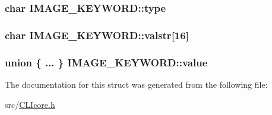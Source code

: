 \hypertarget{structIMAGE__KEYWORD_a93acc5dd5d573d8e91129b27332e4ef4}{
\subsubsection[{type}]{\setlength{\rightskip}{0pt plus 5cm}char I\+M\+A\+G\+E\+\_\+\+K\+E\+Y\+W\+O\+R\+D\+::type}}\label{structIMAGE__KEYWORD_a93acc5dd5d573d8e91129b27332e4ef4}
\hypertarget{structIMAGE__KEYWORD_a148ed6e2cddc70400b2692efbdd23280}{
\subsubsection[{valstr}]{\setlength{\rightskip}{0pt plus 5cm}char I\+M\+A\+G\+E\+\_\+\+K\+E\+Y\+W\+O\+R\+D\+::valstr\mbox{[}16\mbox{]}}}\label{structIMAGE__KEYWORD_a148ed6e2cddc70400b2692efbdd23280}
\hypertarget{structIMAGE__KEYWORD_a93da8b101ca9f8e620803c6e39316b0e}{
\subsubsection[{value}]{\setlength{\rightskip}{0pt plus 5cm}union \{ ... \}   I\+M\+A\+G\+E\+\_\+\+K\+E\+Y\+W\+O\+R\+D\+::value}}\label{structIMAGE__KEYWORD_a93da8b101ca9f8e620803c6e39316b0e}


The documentation for this struct was generated from the following file\+:\begin{DoxyCompactItemize}
\item 
src/\hyperlink{CLIcore_8h}{C\+L\+Icore.\+h}\end{DoxyCompactItemize}
